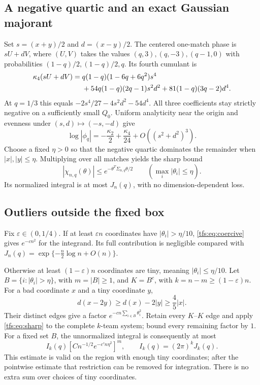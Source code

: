 \documentclass[11pt,a4paper]{article}
\numberwithin{equation}{section}
\theoremstyle{remark}
\newcommand{\1}{\mathbf 1}
\begin{document}
\subsection{A negative quartic and an exact Gaussian majorant}
Set $s=(x+y)/2$ and $d=(x-y)/2$. The centered one-match phase is $sU+dV$,
where $(U,V)$ takes the values $(q,3),(q,-3),(q-1,0)$ with probabilities
$(1-q)/2,(1-q)/2,q$. Its fourth cumulant is
\begin{align}\label{tfs:eq:quartic}
\kappa_4(sU+dV)={}&q(1-q)(1-6q+6q^2)s^4\notag\\
 &+54q(1-q)(2q-1)s^2d^2+81(1-q)(3q-2)d^4.
\end{align}
At $q=1/3$ this equals $-2s^4/27-4s^2d^2-54d^4$.
All three coefficients stay strictly negative on a sufficiently small
$Q_0$. Uniform analyticity near the origin and evenness under
$(s,d)\mapsto(-s,-d)$ give
\[
\log|\phi_q|=-\frac{\kappa_2}{2}+\frac{\kappa_4}{24}
                       +O((s^2+d^2)^3).
\]
Choose a fixed $\eta>0$ so that the negative quartic dominates the remainder
when $|x|,|y|\leq\eta$. Multiplying over all matches yields the sharp bound
\begin{equation}\label{tfs:eq:sharp}
|\chi_{n,q}(\theta)|\leq
     e^{-\theta^T\Sigma_{n,q}\theta/2}\qquad
                          (\max_i|\theta_i|\leq\eta).
\end{equation}
Its normalized integral is at most $J_n(q)$, with no dimension-dependent
loss.

\subsection{Outliers outside the fixed box}
Fix $\varepsilon\in(0,1/4)$. If at least $\varepsilon n$ coordinates have
$|\theta_i|>\eta/10$, \eqref{tfs:eq:coercive} gives $e^{-cn^2}$ for the
integrand. Its full contribution is negligible compared with
$J_n(q)=\exp\{-\tfrac n2\log n+O(n)\}$.

Otherwise at least $(1-\varepsilon)n$ coordinates are tiny, meaning
$|\theta_i|\leq\eta/10$. Let $B=\{i:|\theta_i|>\eta\}$, with
$m=|B|\geq1$, and $K=B^c$, with $k=n-m\geq(1-\varepsilon)n$.
For a bad coordinate $x$ and a tiny coordinate $y$,
\[
d(x-2y)\geq d(x)-2|y|\geq\frac45|x|.
\]
Their distinct edges give a factor $e^{-cn\sum_{i\in B}\theta_i^2}$.
Retain every $K$--$K$ edge and apply \eqref{tfs:eq:sharp} to the complete
$k$-team system; bound every remaining factor by $1$. For a fixed set $B$,
the unnormalized integral is consequently at most
\begin{equation}\label{tfs:eq:outlier}
I_k(q)\left[C n^{-1/2}e^{-c'n\eta^2}\right]^m,
\qquad I_k(q)=(2\pi)^kJ_k(q).
\end{equation}
This estimate is valid on the region with enough tiny coordinates; after
the pointwise estimate that restriction can be removed for integration.
There is no extra sum over choices of tiny coordinates.
\end{document}
